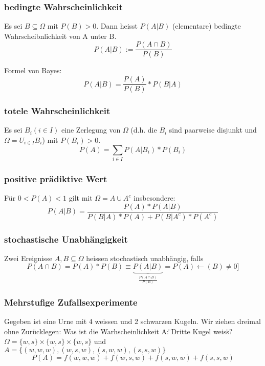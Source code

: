 \documentclass[landscape,twocolumn,a4paper]{article}
\begin{document}
\subsubsection*{bedingte Wahrscheinlichkeit}
Es sei $B \subseteq \Omega$ mit $P(B) > 0$. Dann heisst $P(A|B)$ (elementare) bedingte Wahrscheibnlichkeit von A unter B.
\begin{equation}
	 P(A|B) := \frac{P(A \cap B)}{P(B)}
\end{equation}

Formel von Bayes:
\begin{equation}
	 P(A|B)=\frac{P(A)}{P(B)} * P(B | A)
\end{equation}

\subsubsection*{totele Wahrscheinlichkeit}
Es sei  $B_i(i \in I)$ eine Zerlegung von $\Omega$ (d.h. die $B_i$ sind paarweise disjunkt und $\Omega=U_{i \in I} B_i$) mit $P(B_i) > 0$.
\begin{equation}
	 P(A) = \sum_{i \in I} P(A | B_i) * P(B_i)
\end{equation}

\subsubsection*{positive prädiktive Wert}
Für $0 < P(A) < 1$ gilt mit $\Omega = A \cup A^c$ insbesondere:
\begin{equation}
	 P(A | B) = \frac{P(A)*P(A | B)}{P(B | A) * P(A) + P(B | A^c) * P(A^c)}
\end{equation}

\subsubsection*{stochastische Unabhängigkeit}
Zwei Ereignisse $A,B \subseteq \Omega$ heissen stochastisch unabhängig, falls 
\begin{equation}
	P(A \cap B) = P(A) * P(B)  \equiv \underbrace{P(A|B)}_{\frac{P(A \cap B)}{P(B)}}=P(A) \leftarrow (B) \neq 0]
\end{equation}

\subsubsection*{Mehrstufige Zufallsexperimente}
Gegeben ist eine Urne mit 4 weissen und 2 schwarzen Kugeln. Wir ziehen dreimal ohne Zurücklegen: Was ist die Warhscheinlichkeit A: \"{ }Dritte Kugel weiss\"{}? \\
$\Omega = \{w,s\} \times \{w,s\} \times \{w,s\}$ und $A= \{(w,w,w),(w,s,w),(s,w,w),(s,s,w)\}$
\begin{equation}
	P(A) = f(w,w,w) + f(w,s,w) + f(s,w,w) + f(s,s,w)
\end{equation}
\end{document}

